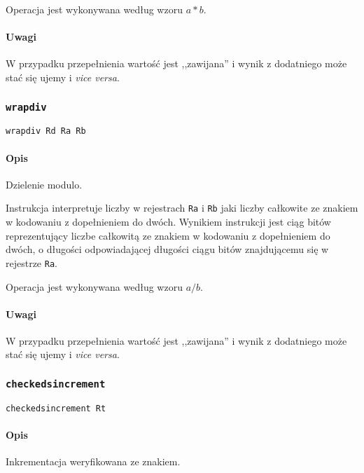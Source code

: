 Operacja jest wykonywana według wzoru $a * b$.

\paragraph*{Uwagi}

W przypadku przepełnienia wartość jest ,,zawijana'' i wynik z dodatniego może
stać się ujemy i \emph{vice versa}.

\subsubsection{\texttt{wrapdiv}}

\begin{lstlisting}
wrapdiv Rd Ra Rb
\end{lstlisting}

\paragraph*{Opis} Dzielenie modulo.

Instrukcja interpretuje liczby w rejestrach \texttt{Ra} i \texttt{Rb} jaki
liczby całkowite ze znakiem w kodowaniu z dopełnieniem do dwóch. Wynikiem
instrukcji jest ciąg bitów reprezentujący liczbe całkowitą ze znakiem w
kodowaniu z dopełnieniem do dwóch, o długości odpowiadającej długości ciągu
bitów znajdującemu się w rejestrze \texttt{Ra}.

Operacja jest wykonywana według wzoru $a / b$.

\paragraph*{Uwagi}

W przypadku przepełnienia wartość jest ,,zawijana'' i wynik z dodatniego może
stać się ujemy i \emph{vice versa}.

\subsubsection{\texttt{checkedsincrement}}

\begin{lstlisting}
checkedsincrement Rt
\end{lstlisting}

\paragraph*{Opis} Inkrementacja weryfikowana ze znakiem.

